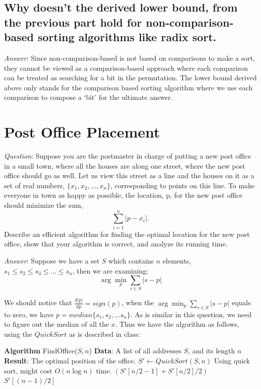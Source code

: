 \documentclass[11pt]{article}
\begin{document}
\subsection{Why doesn't the derived lower bound, from the previous part hold for non-comparison-based sorting algorithms like radix sort.}
\noindent \emph{Answer}: Since non-comparison-based is not based on comparisons to make a sort, they cannot be viewed as a comparison-based approach where each comparison can be treated as searching for a bit in the permutation. The lower bound derived above only stands for the comparison based sorting algorithm where we use each comparison to compose a `bit' for the ultimate answer.
\section{Post Office Placement}
\noindent \emph{Question}: Suppose you are the postmaster in charge of putting a new post office in a small town, where all the houses are along one street, where the new post office should go as well. Let us view this street as a line and the houses on it as a set of real numbers, $\{x_1, x_2, . . . , x_n\}$, corresponding to points on this line. To make everyone in town as happy as possible, the location, p, for the new post office should minimize the sum,
\begin{equation*}
	\sum_{i=1}^{n} |p-x_i|.
\end{equation*}
Describe an efficient algorithm for finding the optimal location for the new post office, show that your algorithm is correct, and analyze its running time.

\noindent \emph{Answer}: Suppose we have a set $S$ which contains $n$ elements, $s_1\leq s_2\leq s_3\leq ... \leq s_n$, then we are examining:
\begin{equation*}
	\arg \min_{p} \sum_{s\in S} |s-p|
\end{equation*}

We should notice that $\frac{d |p|}{d p}=sign (p)$, when the $\arg \min_{p} \sum_{s\in S} |s-p|$ equals to zero, we have $p=median\{s_1,s_2,...s_n\}$. As is similar in this question, we need to figure out the median of all the $x$. Thus we have the algorithm as follows, using the $QuickSort$ as is described in class:
\begin{algorithmic}
	\State \textbf{Algorithm} FindOffice($S,n$)
	\State \textbf{Data}: A list of all addresses $S$, and its length $n$
	\State \textbf{Result}: The optimal position of the office.
	\State $S'\gets QuickSort(S,n)$ \Comment Using quick sort, might cost $O(n\log n)$ time.
		\State \Return $(S'[n/2-1]+S'[n/2]/2)$
	\Else
		\State \Return $S'[(n-1)/2]$ 
	\EndIf
\end{algorithmic}
\end{document}
